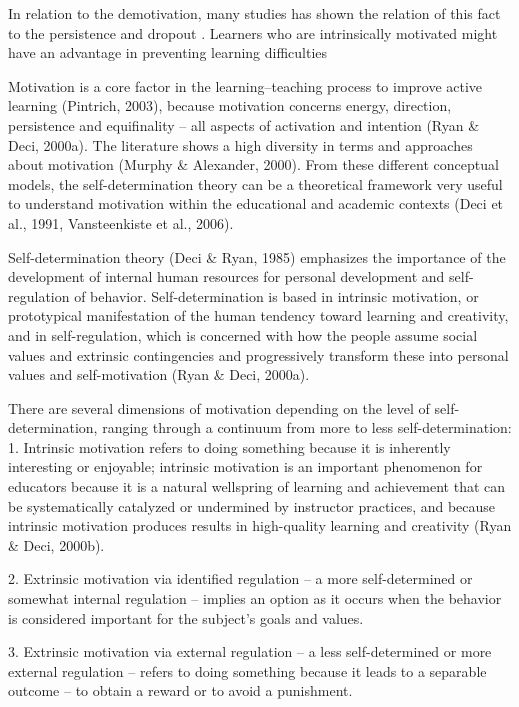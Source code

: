 In relation to the demotivation, many studies has shown the relation of this fact to the persistence and dropout \cite{Hart2012,Grau-ValldoseraMinguillon2014,HartnettGeorgeDron2011}.
Learners who are intrinsically motivated might have an advantage in preventing learning difficulties




Motivation is a core factor in the learning–teaching process to improve active learning (Pintrich, 2003), because motivation concerns energy, direction, persistence and equifinality – all aspects of activation and intention (Ryan & Deci, 2000a). The literature shows a high diversity in terms and approaches about motivation (Murphy & Alexander, 2000). From these different conceptual models, the self-determination theory can be a theoretical framework very useful to understand motivation within the educational and academic contexts (Deci et al., 1991, Vansteenkiste et al., 2006). 

 Self-determination theory (Deci & Ryan, 1985) emphasizes the importance of the development of internal human resources for personal development and self-regulation of behavior. Self-determination is based in intrinsic motivation, or prototypical manifestation of the human tendency toward learning and creativity, and in self-regulation, which is concerned with how the people assume social values and extrinsic contingencies and progressively transform these into personal values and self-motivation (Ryan & Deci, 2000a).

There are several dimensions of motivation depending on the level of self-determination, ranging through a continuum from more to less self-determination:
1.
Intrinsic motivation refers to doing something because it is inherently interesting or enjoyable; intrinsic motivation is an important phenomenon for educators because it is a natural wellspring of learning and achievement that can be systematically catalyzed or undermined by instructor practices, and because intrinsic motivation produces results in high-quality learning and creativity (Ryan & Deci, 2000b).

2.
Extrinsic motivation via identified regulation – a more self-determined or somewhat internal regulation – implies an option as it occurs when the behavior is considered important for the subject’s goals and values.

3.
Extrinsic motivation via external regulation – a less self-determined or more external regulation – refers to doing something because it leads to a separable outcome – to obtain a reward or to avoid a punishment.

